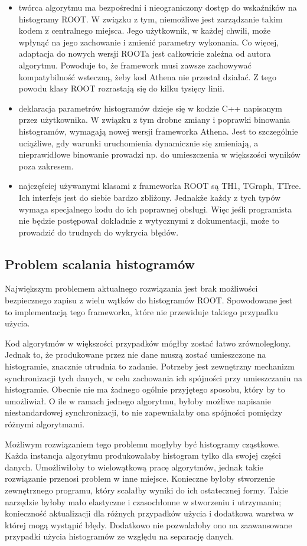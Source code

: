 \begin{itemize}
\item twórca algorytmu ma bezpośredni i nieograniczony dostęp do wskaźników na histogramy ROOT. 
W związku z tym, niemożliwe jest zarządzanie takim kodem z centralnego miejsca.
Jego użytkownik, w każdej chwili, może wpłynąć na jego zachowanie i zmienić parametry wykonania.
Co więcej, adaptacja do nowych wersji ROOTa jest całkowicie zależna od autora algorytmu. 
Powoduje to, że framework musi zawsze zachowywać kompatybilność wsteczną, żeby kod Athena nie przestał działać.
Z tego powodu klasy ROOT rozrastają się do kilku tysięcy linii.
\item deklaracja parametrów histogramów dzieje się w kodzie C++ napisanym przez użytkownika. 
W związku z tym drobne zmiany i poprawki binowania histogramów, wymagają nowej wersji frameworka Athena. 
Jest to szczególnie uciążliwe, gdy warunki uruchomienia dynamicznie się zmieniają, a nieprawidłowe binowanie prowadzi np. do umieszczenia w większości wyników poza zakresem.
\item najczęściej używanymi klasami z frameworka ROOT są TH1, TGraph, TTree. 
Ich interfejs jest do siebie bardzo zbliżony. 
Jednakże każdy z tych typów wymaga specjalnego kodu do ich poprawnej obsługi. 
Więc jeśli programista nie będzie postępował dokładnie z wytycznymi z dokumentacji, może to prowadzić do trudnych do wykrycia błędów. 
\end{itemize}

\subsection{Problem scalania histogramów}
Największym problemem aktualnego rozwiązania jest brak możliwości bezpiecznego zapisu z wielu wątków do histogramów ROOT.
Spowodowane jest to implementacją tego frameworka, które nie przewiduje takiego przypadku użycia. 

Kod algorytmów w większości przypadków mógłby zostać łatwo zrównoleglony.
Jednak to, że produkowane przez nie dane muszą zostać umieszczone na histogramie, znacznie utrudnia to zadanie.
Potrzeby jest zewnętrzny mechanizm synchronizacji tych danych, w celu zachowania ich spójności przy umieszczaniu na histogramie.
Obecnie nie ma żadnego ogólnie przyjętego sposobu, który by to umożliwiał.
O ile w ramach jednego algorytmu, byłoby możliwe napisanie niestandardowej synchronizacji, to nie zapewniałaby ona spójności pomiędzy różnymi algorytmami.

Możliwym rozwiązaniem tego problemu mogłyby być histogramy cząstkowe.
Każda instancja algorytmu produkowałaby histogram tylko dla swojej części danych.
Umożliwiłoby to wielowątkową pracę algorytmów, jednak takie rozwiązanie przenosi problem w inne miejsce. 
Konieczne byłoby stworzenie zewnętrznego programu, który scalałby wyniki do ich ostatecznej formy.
Takie narzędzie byłoby mało elastyczne i czasochłonne w stworzeniu i utrzymaniu; konieczność aktualizacji dla różnych przypadków użycia i dodatkowa warstwa w której mogą wystąpić błędy. 
Dodatkowo nie pozwalałoby ono na zaawansowane przypadki użycia histogramów ze względu na separację danych.